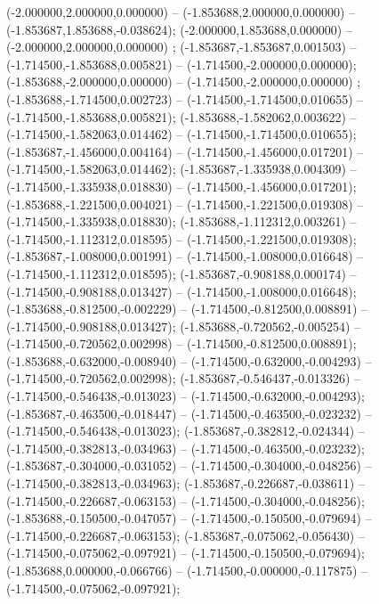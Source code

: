  (-2.000000,2.000000,0.000000) -- (-1.853688,2.000000,0.000000) -- (-1.853687,1.853688,-0.038624);
 (-2.000000,1.853688,0.000000) -- (-2.000000,2.000000,0.000000) ;
 (-1.853687,-1.853687,0.001503) -- (-1.714500,-1.853688,0.005821) -- (-1.714500,-2.000000,0.000000);
 (-1.853688,-2.000000,0.000000) -- (-1.714500,-2.000000,0.000000) ;
 (-1.853688,-1.714500,0.002723) -- (-1.714500,-1.714500,0.010655) -- (-1.714500,-1.853688,0.005821);
 (-1.853688,-1.582062,0.003622) -- (-1.714500,-1.582063,0.014462) -- (-1.714500,-1.714500,0.010655);
 (-1.853687,-1.456000,0.004164) -- (-1.714500,-1.456000,0.017201) -- (-1.714500,-1.582063,0.014462);
 (-1.853687,-1.335938,0.004309) -- (-1.714500,-1.335938,0.018830) -- (-1.714500,-1.456000,0.017201);
 (-1.853688,-1.221500,0.004021) -- (-1.714500,-1.221500,0.019308) -- (-1.714500,-1.335938,0.018830);
 (-1.853688,-1.112312,0.003261) -- (-1.714500,-1.112312,0.018595) -- (-1.714500,-1.221500,0.019308);
 (-1.853687,-1.008000,0.001991) -- (-1.714500,-1.008000,0.016648) -- (-1.714500,-1.112312,0.018595);
 (-1.853687,-0.908188,0.000174) -- (-1.714500,-0.908188,0.013427) -- (-1.714500,-1.008000,0.016648);
 (-1.853688,-0.812500,-0.002229) -- (-1.714500,-0.812500,0.008891) -- (-1.714500,-0.908188,0.013427);
 (-1.853688,-0.720562,-0.005254) -- (-1.714500,-0.720562,0.002998) -- (-1.714500,-0.812500,0.008891);
 (-1.853688,-0.632000,-0.008940) -- (-1.714500,-0.632000,-0.004293) -- (-1.714500,-0.720562,0.002998);
 (-1.853687,-0.546437,-0.013326) -- (-1.714500,-0.546438,-0.013023) -- (-1.714500,-0.632000,-0.004293);
 (-1.853687,-0.463500,-0.018447) -- (-1.714500,-0.463500,-0.023232) -- (-1.714500,-0.546438,-0.013023);
 (-1.853687,-0.382812,-0.024344) -- (-1.714500,-0.382813,-0.034963) -- (-1.714500,-0.463500,-0.023232);
 (-1.853687,-0.304000,-0.031052) -- (-1.714500,-0.304000,-0.048256) -- (-1.714500,-0.382813,-0.034963);
 (-1.853687,-0.226687,-0.038611) -- (-1.714500,-0.226687,-0.063153) -- (-1.714500,-0.304000,-0.048256);
 (-1.853688,-0.150500,-0.047057) -- (-1.714500,-0.150500,-0.079694) -- (-1.714500,-0.226687,-0.063153);
 (-1.853687,-0.075062,-0.056430) -- (-1.714500,-0.075062,-0.097921) -- (-1.714500,-0.150500,-0.079694);
 (-1.853688,0.000000,-0.066766) -- (-1.714500,-0.000000,-0.117875) -- (-1.714500,-0.075062,-0.097921);
